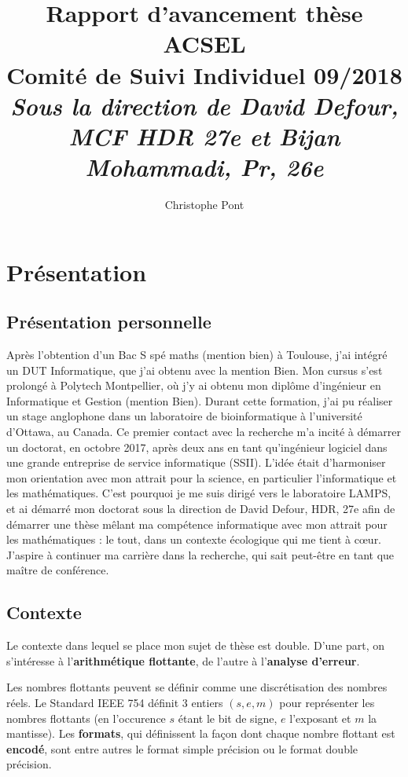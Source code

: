 \documentclass[a4paper,11pt]{article}
\title{%
  Rapport d'avancement thèse ACSEL \\
  \large Comité de Suivi Individuel 09/2018 \\ %
  \large \textit{Sous la direction de David Defour, MCF HDR 27e et Bijan Mohammadi, Pr, 26e}}
\author{Christophe Pont}
\begin{document}
\maketitle
\tableofcontents


\section{Présentation}

\subsection{Présentation personnelle}
Après l’obtention d’un Bac S spé maths (mention bien) à Toulouse, j’ai intégré un DUT Informatique, que j'ai obtenu avec la mention Bien. Mon cursus s’est prolongé à Polytech Montpellier, où j’y ai obtenu mon diplôme d’ingénieur en Informatique et Gestion (mention Bien). Durant cette formation, j’ai pu réaliser un stage anglophone dans un laboratoire de bioinformatique à l’université d’Ottawa, au Canada. Ce premier contact avec la recherche m’a incité à démarrer un doctorat, en octobre 2017, après deux ans en tant qu’ingénieur logiciel dans une grande entreprise de service informatique (SSII). L’idée était d’harmoniser mon orientation avec mon attrait pour la science, en particulier l’informatique et les mathématiques. C’est pourquoi je me suis dirigé vers le laboratoire LAMPS, et ai démarré mon doctorat sous la direction de David Defour, HDR, 27e afin de démarrer une thèse mêlant ma compétence informatique avec mon attrait pour les mathématiques : le tout, dans un contexte écologique qui me tient à cœur. J’aspire à continuer ma carrière dans la recherche, qui sait peut-être en tant que maître de conférence.

\subsection{Contexte}
Le contexte dans lequel se place mon sujet de thèse est double.
D’une part, on s’intéresse à l’\textbf{arithmétique flottante}, de l'autre à l'\textbf{analyse d'erreur}. 

Les nombres flottants peuvent se définir comme une discrétisation des nombres réels. 
Le Standard IEEE 754\cite{zuras2008ieee} définit 3 entiers $(s,e,m)$ pour représenter les nombres flottants (en l'occurence $s$ étant le bit de signe, $e$ l'exposant et $m$ la mantisse). Les \textbf{formats}, qui définissent la façon dont chaque nombre flottant est \textbf{encodé}, sont entre autres le format simple précision ou le format double précision.
\end{document}
